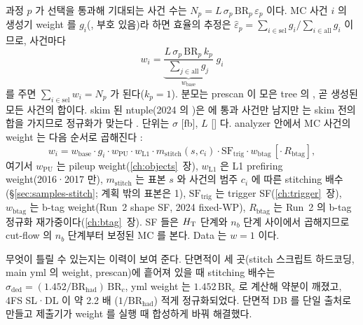과정 $p$ 가 선택을 통과해 기대되는 사건 수는 $N_p=L\,\sigma_p\,\mathrm{BR}_p\,\varepsilon_p$ 이다. MC 사건 $i$ 의 생성기 weight 를 $g_i$(, 부호
있음)라 하면 효율의 추정은 $\hat\varepsilon_p=\sum_{i\in\mathrm{sel}}g_i\big/\sum_{i\in\mathrm{all}}g_i$ 이므로, 사건마다
\begin{equation}
  w_i = \underbrace{\frac{L\,\sigma_p\,\mathrm{BR}_p\,k_p}{\sum_{j\in\mathrm{all}}g_j}}_{w_{\mathrm{base}}}\;g_i
  \label{eq:samples-weight}
\end{equation}
를 주면 $\sum_{i\in\mathrm{sel}}w_i=N_p$ 가 된다($k_p=1$). 분모는 prescan 이 모은  tree 의 , 곧 생성된 모든 사건의
합이다. skim 된 ntuple(2024 의 )은  에 통과 사건만 남지만  는 skim 전의 합을 가지므로 정규화가 맞는다
. 단위는 $\sigma$ [fb], $L$ [\fbinv] 다. analyzer 안에서 MC 사건의 weight 는 다음 순서로 곱해진다
:
\begin{equation}
  w_i = w_{\mathrm{base}}\cdot g_i\cdot w_{\mathrm{PU}}\cdot w_{\mathrm{L1}}\cdot m_{\mathrm{stitch}}(s,c_i)\cdot \mathrm{SF}_{\mathrm{trig}}\cdot w_{\mathrm{btag}}\,[\cdot\,R_{\mathrm{btag}}],
  \label{eq:samples-chain}
\end{equation}
여기서 $w_{\mathrm{PU}}$ 는 pileup weight(\ref{ch:objects}~장), $w_{\mathrm{L1}}$ 은 L1 prefiring weight(2016·2017 만), $m_{\mathrm{stitch}}$ 는 표본 $s$ 와 사건의
\ttbar 범주 $c_i$ 에 따른 stitching 배수(\S\ref{sec:samples-stitch}; 계획 밖의 표본은 1), $\mathrm{SF}_{\mathrm{trig}}$ 는 trigger SF(\ref{ch:trigger}~장),
$w_{\mathrm{btag}}$ 는 b-tag weight(Run~2 shape SF, 2024 fixed-WP), $R_{\mathrm{btag}}$ 는 Run~2 의 b-tag 정규화 재가중이다(\ref{ch:btag}~장). SF 들은 $H_{\mathrm{T}}$ 단계와
$n_b$ 단계 사이에서 곱해지므로 cut-flow 의 $n_b$ 단계부터 보정된 MC 를 본다. Data 는 $w=1$ 이다.

무엇이 틀릴 수 있는지는 이력이 보여 준다. 단면적이 세 곳(stitch 스크립트 하드코딩, main yml 의 weight, prescan)에 흩어져 있을 때 stitching 배수는
$\sigma_{\mathrm{ded}}=(1.452/\mathrm{BR}_{\mathrm{had}})\,\mathrm{BR}_c$, yml weight 는 $1.452\,\mathrm{BR}_c$ 로 계산해 약분이 깨졌고, 4FS \ttbb SL·DL 이 약 2.2 배
($1/\mathrm{BR}_{\mathrm{had}}$) 적게 정규화되었다. 단면적 DB 를 단일 출처로 만들고 제출기가 weight 를 실행 때 합성하게 바꿔 해결했다.

